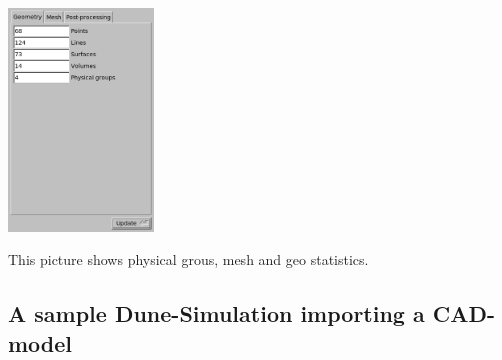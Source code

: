 \begin{frame}
\begin{center}
    \includegraphics[width=0.29\textwidth]{./EPS/L/L_geostatistics}\\
  \end{center}
  This picture shows physical grous, mesh and geo statistics.
\end{frame}

\subsection{A sample Dune-Simulation importing a CAD-model}

